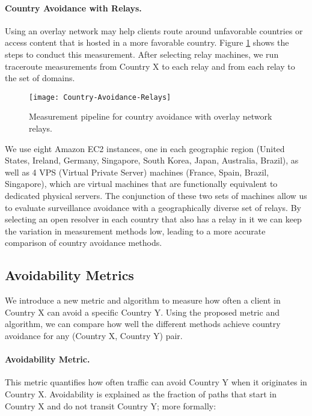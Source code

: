 \paragraph{Country Avoidance with Relays.} Using an overlay network may help clients route around unfavorable countries or access content that is hosted in a more favorable country.  Figure \ref{fig:avoidance_relays} shows the steps to conduct this measurement.  After selecting relay machines, we run traceroute measurements from Country X to each relay and from each relay to the set of domains. 

\begin{figure}[t]
\centering
\texttt{[image: Country-Avoidance-Relays]}
\caption{Measurement pipeline for country avoidance with overlay network relays.}
\label{fig:avoidance_relays}
\end{figure}

We use eight Amazon EC2 instances, one in each geographic region (United States, Ireland, Germany, Singapore, South Korea, Japan, Australia, Brazil), as well as 4 VPS (Virtual Private Server) machines (France, Spain, Brazil, Singapore), which are virtual machines that are functionally equivalent to dedicated physical servers.  The conjunction of these two sets of machines allow us to evaluate surveillance avoidance with a geographically diverse set of relays. By selecting an open resolver in each country that also has a relay in it we can keep the variation in measurement methods low, leading to a more accurate comparison of country avoidance methods.

\subsection{Avoidability Metrics}
\label{metrics}
We introduce a new metric and algorithm to measure how often a client in Country X can avoid a specific Country Y.  Using the proposed metric and algorithm, we can compare how well the different methods achieve country avoidance for any (Country X, Country Y) pair.

\paragraph{Avoidability Metric.}  This metric quantifies how often traffic can avoid Country Y when it originates in Country X.  Avoidability is explained as the fraction of paths that start in Country X and do not transit Country Y; more formally:

